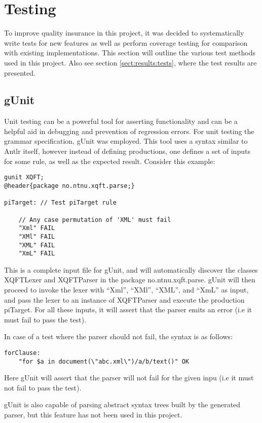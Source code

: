 \section{Testing}
\label{sect:method:testing}
To improve quality insurance in this project, it was decided to systematically
write tests for new features as well as perform coverage testing for comparison
with existing implementations. This section will outline the various test
methods used in this project. Also see section \ref{sect:results:tests}, where
the test results are presented.

\subsection{gUnit}
\label{sect:method:gUnit}
Unit testing can be a powerful tool for asserting functionality and can be a
helpful aid in debugging and prevention of regression errors.  For unit testing the
grammar specification, gUnit \cite{gunit00} was employed. This tool uses a
syntax similar to Antlr itself, however instead of defining productions, one
defines a set of inputs for some rule, as well as the expected result. Consider
this example:

\begin{Verbatim}
gunit XQFT;
@header{package no.ntnu.xqft.parse;}

piTarget: // Test piTarget rule

    // Any case permutation of 'XML' must fail
    "Xml" FAIL
    "XMl" FAIL
    "XML" FAIL
    "XmL" FAIL
\end{Verbatim}

This is a complete input file for gUnit, and will automatically discover the
classes XQFTLexer and XQFTParser in the package no.ntnu.xqft.parse. gUnit will
then proceed to invoke the lexer with ``Xml'', ``XMl'', ``XML'', and ``XmL'' as
input, and pass the lexer to an instance of XQFTParser and execute the production
piTarget. For all these inputs, it will assert that the parser emits an error
(i.e it must fail to pass the test).

In case of a test where the parser should not fail, the syntax is as follows:
\begin{Verbatim}
forClause:
	"for $a in document(\"abc.xml\")/a/b/text()" OK
\end{Verbatim}
Here gUnit will assert that the parser will not fail for the given inpu (i.e it
must not fail to pass the test).

gUnit is also capable of parsing abstract syntax trees built by the generated
parser, but this feature has not been used in this project.

